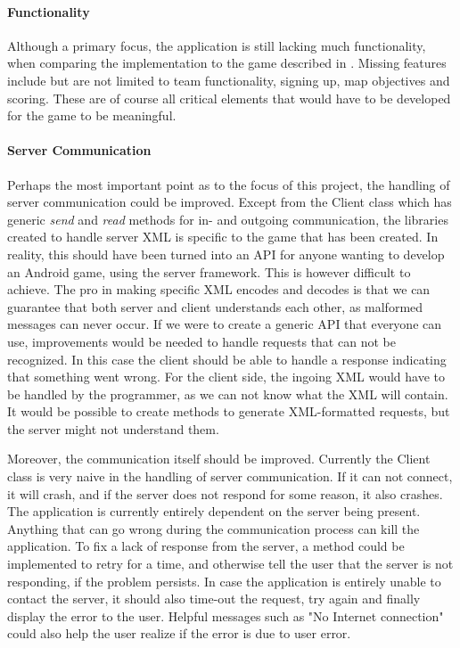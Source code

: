 \paragraph{Functionality}
Although a primary focus, the application is still lacking much functionality, when comparing the implementation to the game described in . Missing features include but are not limited to team functionality, signing up, map objectives and scoring. These are of course all critical elements that would have to be developed for the game to be meaningful.

\paragraph{Server Communication}
Perhaps the most important point as to the focus of this project, the handling of server communication could be improved. Except from the Client class which has generic \textit{send} and \textit{read} methods for in- and outgoing communication, the libraries created to handle server XML is specific to the game that has been created. In reality, this should have been turned into an API for anyone wanting to develop an Android game, using the server framework. This is however difficult to achieve. The pro in making specific XML encodes and decodes is that we can guarantee that both server and client understands each other, as malformed messages can never occur. If we were to create a generic API that everyone can use, improvements would be needed to handle requests that can not be recognized. In this case the client should be able to handle a response indicating that something went wrong. For the client side, the ingoing XML would have to be handled by the programmer, as we can not know what the XML will contain. It would be possible to create methods to generate XML-formatted requests, but the server might not understand them.

Moreover, the communication itself should be improved. Currently the Client class is very naive in the handling of server communication. If it can not connect, it will crash, and if the server does not respond for some reason, it also crashes. The application is currently entirely dependent on the server being present. Anything that can go wrong during the communication process can kill the application. To fix a lack of response from the server, a method could be implemented to retry for a time, and otherwise tell the user that the server is not responding, if the problem persists. In case the application is entirely unable to contact the server, it should also time-out the request, try again and finally display the error to the user. Helpful messages such as "No Internet connection" could also help the user realize if the error is due to user error.
